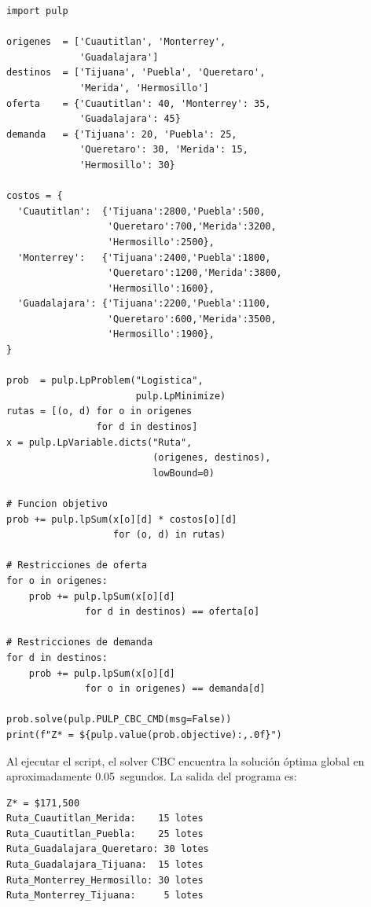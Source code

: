 \documentclass[10pt,letterpaper,twocolumn]{article}
\begin{document}
\begin{lstlisting}
import pulp

origenes  = ['Cuautitlan', 'Monterrey',
             'Guadalajara']
destinos  = ['Tijuana', 'Puebla', 'Queretaro',
             'Merida', 'Hermosillo']
oferta    = {'Cuautitlan': 40, 'Monterrey': 35,
             'Guadalajara': 45}
demanda   = {'Tijuana': 20, 'Puebla': 25,
             'Queretaro': 30, 'Merida': 15,
             'Hermosillo': 30}

costos = {
  'Cuautitlan':  {'Tijuana':2800,'Puebla':500,
                  'Queretaro':700,'Merida':3200,
                  'Hermosillo':2500},
  'Monterrey':   {'Tijuana':2400,'Puebla':1800,
                  'Queretaro':1200,'Merida':3800,
                  'Hermosillo':1600},
  'Guadalajara': {'Tijuana':2200,'Puebla':1100,
                  'Queretaro':600,'Merida':3500,
                  'Hermosillo':1900},
}

prob  = pulp.LpProblem("Logistica",
                       pulp.LpMinimize)
rutas = [(o, d) for o in origenes
                for d in destinos]
x = pulp.LpVariable.dicts("Ruta",
                          (origenes, destinos),
                          lowBound=0)

# Funcion objetivo
prob += pulp.lpSum(x[o][d] * costos[o][d]
                   for (o, d) in rutas)

# Restricciones de oferta
for o in origenes:
    prob += pulp.lpSum(x[o][d]
              for d in destinos) == oferta[o]

# Restricciones de demanda
for d in destinos:
    prob += pulp.lpSum(x[o][d]
              for o in origenes) == demanda[d]

prob.solve(pulp.PULP_CBC_CMD(msg=False))
print(f"Z* = ${pulp.value(prob.objective):,.0f}")
\end{lstlisting}

Al ejecutar el script, el solver CBC encuentra la solución óptima global en aproximadamente 0.05~segundos. La salida del programa es:

\begin{lstlisting}[style=terminalStyle]
Z* = $171,500
Ruta_Cuautitlan_Merida:    15 lotes
Ruta_Cuautitlan_Puebla:    25 lotes
Ruta_Guadalajara_Queretaro: 30 lotes
Ruta_Guadalajara_Tijuana:  15 lotes
Ruta_Monterrey_Hermosillo: 30 lotes
Ruta_Monterrey_Tijuana:     5 lotes
\end{lstlisting}
\end{document}
